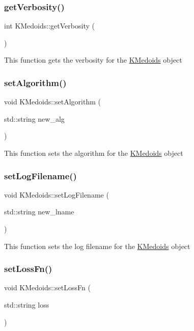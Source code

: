 \subsubsection{\texorpdfstring{get\+Verbosity()}{getVerbosity()}}
{\footnotesize\ttfamily int K\+Medoids\+::get\+Verbosity (\begin{DoxyParamCaption}{ }\end{DoxyParamCaption})}

This function gets the verbosity for the \hyperlink{classKMedoids}{K\+Medoids} object \mbox{\label{classKMedoids_a1a6dbc45f5d83bded48bf86cbc2690ad}} 
\subsubsection{\texorpdfstring{set\+Algorithm()}{setAlgorithm()}}
{\footnotesize\ttfamily void K\+Medoids\+::set\+Algorithm (\begin{DoxyParamCaption}\item[{std\+::string}]{new\+\_\+alg }\end{DoxyParamCaption})}

This function sets the algorithm for the \hyperlink{classKMedoids}{K\+Medoids} object \mbox{\label{classKMedoids_a45f89770245bff638e25bcd39ab52013}} 
\subsubsection{\texorpdfstring{set\+Log\+Filename()}{setLogFilename()}}
{\footnotesize\ttfamily void K\+Medoids\+::set\+Log\+Filename (\begin{DoxyParamCaption}\item[{std\+::string}]{new\+\_\+lname }\end{DoxyParamCaption})}

This function sets the log filename for the \hyperlink{classKMedoids}{K\+Medoids} object \mbox{\label{classKMedoids_ab442bf7198be7a48a7eb5901ac7ca571}} 
\subsubsection{\texorpdfstring{set\+Loss\+Fn()}{setLossFn()}}
{\footnotesize\ttfamily void K\+Medoids\+::set\+Loss\+Fn (\begin{DoxyParamCaption}\item[{std\+::string}]{loss }\end{DoxyParamCaption})}

